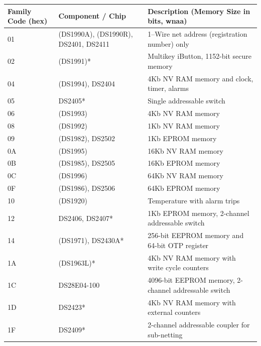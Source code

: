 \begin{center}
\begin{tabular}{|p{}|p{}|p{}|}
\hline
\textbf{Family Code (hex)}
   & \textbf{Component / Chip}            & \textbf{Description \newline (Memory Size in bits, wnaa)} \\ \hline
01 & (DS1990A), (DS1990R), DS2401, DS2411 & 1--Wire net address (registration number) only \\ \hline
02 & (DS1991)*                            & Multikey iButton, 1152-bit secure memory \\ \hline
04 & (DS1994), DS2404                     & 4Kb NV RAM memory and clock, timer, alarms \\ \hline
05 & DS2405*                              & Single addressable switch \\\hline
06 & (DS1993)                             & 4Kb NV RAM memory \\ \hline
08 & (DS1992)                             & 1Kb NV RAM memory \\ \hline
09 & (DS1982), DS2502                     & 1Kb EPROM memory \\ \hline
0A & (DS1995)                             & 16Kb NV RAM memory \\ \hline
0B & (DS1985), DS2505                     & 16Kb EPROM memory \\ \hline
0C & (DS1996)                             & 64Kb NV RAM memory \\ \hline
0F & (DS1986), DS2506                     & 64Kb EPROM memory \\ \hline
10 & (DS1920)                             & Temperature with alarm trips \\ \hline
12 & DS2406, DS2407*                      & 1Kb EPROM memory, 2-channel addressable switch \\ \hline
14 & (DS1971), DS2430A*                   & 256-bit EEPROM memory and 64-bit OTP register \\ \hline
1A & (DS1963L)*                           & 4Kb NV RAM memory with write cycle counters \\ \hline
1C & DS28E04-100                          & 4096-bit EEPROM memory, 2-channel addressable switch \\ \hline
1D & DS2423*                              & 4Kb NV RAM memory with external counters \\ \hline
1F & DS2409*                              & 2-channel addressable coupler for sub-netting \\ \hline

\end{tabular}
\end{center}
